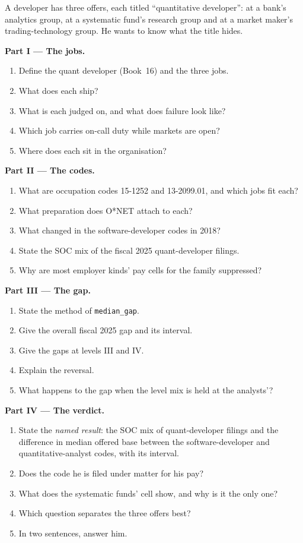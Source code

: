 \begin{problem}\label{pb:in:quant-developer:1}
A developer has three offers, each titled ``quantitative developer'': at a bank's analytics group, at a systematic fund's
research group and at a market maker's trading-technology group. He wants to know what the title hides.

\medskip\noindent\textbf{Part I --- The jobs.}
\begin{enumerate}
\item Define the quant developer (Book~16) and the three jobs.
\item What does each ship?
\item What is each judged on, and what does failure look like?
\item Which job carries on-call duty while markets are open?
\item Where does each sit in the organisation?
\end{enumerate}

\medskip\noindent\textbf{Part II --- The codes.}
\begin{enumerate}[resume]
\item What are occupation codes 15-1252 and 13-2099.01, and which jobs fit each?
\item What preparation does O*NET attach to each?
\item What changed in the software-developer codes in 2018?
\item State the SOC mix of the fiscal 2025 quant-developer filings.
\item Why are most employer kinds' pay cells for the family suppressed?
\end{enumerate}

\medskip\noindent\textbf{Part III --- The gap.}
\begin{enumerate}[resume]
\item State the method of \texttt{median\_gap}.
\item Give the overall fiscal 2025 gap and its interval.
\item Give the gaps at levels III and IV.
\item Explain the reversal.
\item What happens to the gap when the level mix is held at the analysts'?
\end{enumerate}

\medskip\noindent\textbf{Part IV --- The verdict.}
\begin{enumerate}[resume]
\item State the \emph{named result}: the SOC mix of quant-developer filings and the difference in median offered base
between the software-developer and quantitative-analyst codes, with its interval.
\item Does the code he is filed under matter for his pay?
\item What does the systematic funds' cell show, and why is it the only one?
\item Which question separates the three offers best?
\item In two sentences, answer him.
\end{enumerate}
\end{problem}

